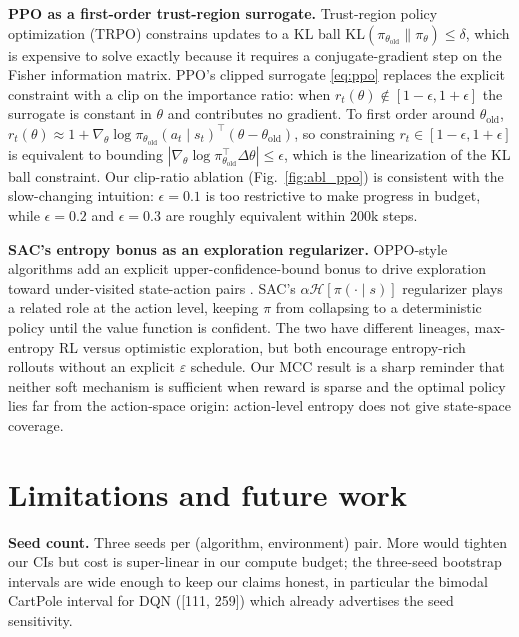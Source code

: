 \documentclass[10pt,a4paper]{article}
\begin{document}
\textbf{PPO as a first-order trust-region surrogate.} Trust-region policy optimization (TRPO) \cite{schulman2015trust} constrains updates to a KL ball $\mathrm{KL}(\pi_{\theta_{\text{old}}} \| \pi_\theta) \leq \delta$, which is expensive to solve exactly because it requires a conjugate-gradient step on the Fisher information matrix. PPO's clipped surrogate \eqref{eq:ppo} replaces the explicit constraint with a clip on the importance ratio: when $r_t(\theta) \notin [1{-}\epsilon, 1{+}\epsilon]$ the surrogate is constant in $\theta$ and contributes no gradient. To first order around $\theta_{\text{old}}$, $r_t(\theta) \approx 1 + \nabla_\theta \log \pi_{\theta_{\text{old}}}(a_t \mid s_t)^{\top} (\theta - \theta_{\text{old}})$, so constraining $r_t \in [1-\epsilon, 1+\epsilon]$ is equivalent to bounding $|\nabla_\theta \log \pi_{\theta_{\text{old}}}^{\top} \Delta\theta| \leq \epsilon$, which is the linearization of the KL ball constraint. Our clip-ratio ablation (Fig.~\ref{fig:abl_ppo}) is consistent with the slow-changing intuition: $\epsilon{=}0.1$ is too restrictive to make progress in budget, while $\epsilon{=}0.2$ and $\epsilon{=}0.3$ are roughly equivalent within 200k steps.

\textbf{SAC's entropy bonus as an exploration regularizer.} OPPO-style algorithms add an explicit upper-confidence-bound bonus to drive exploration toward under-visited state-action pairs \cite{cai2020provably}. SAC's $\alpha \mathcal{H}[\pi(\cdot \mid s)]$ regularizer plays a related role at the action level, keeping $\pi$ from collapsing to a deterministic policy until the value function is confident. The two have different lineages, max-entropy RL versus optimistic exploration, but both encourage entropy-rich rollouts without an explicit $\varepsilon$ schedule. Our MCC result is a sharp reminder that neither soft mechanism is sufficient when reward is sparse and the optimal policy lies far from the action-space origin: action-level entropy does not give state-space coverage.


\section{Limitations and future work}

\textbf{Seed count.} Three seeds per (algorithm, environment) pair. More would tighten our CIs but cost is super-linear in our compute budget; the three-seed bootstrap intervals are wide enough to keep our claims honest, in particular the bimodal CartPole interval for DQN ([111, 259]) which already advertises the seed sensitivity.
\end{document}
